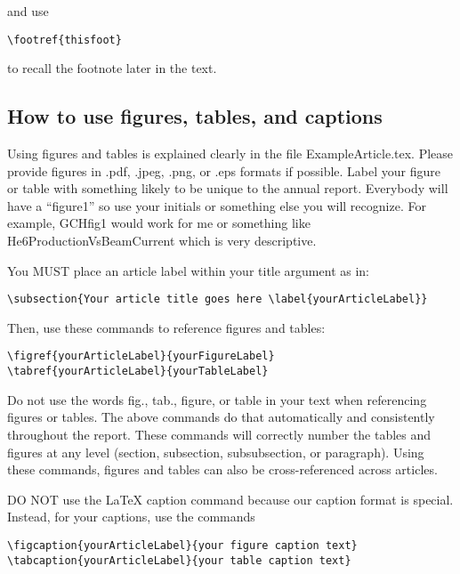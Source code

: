 \documentclass[twoside,11pt]{article}
\begin{document}
\noindent
and use 

\begin{verbatim}
\footref{thisfoot} 
\end{verbatim}

\noindent
to recall the footnote later in the text.

\subsection{How to use figures, tables, and captions}

Using figures and tables is explained clearly in the file ExampleArticle.tex. Please provide figures in .pdf, .jpeg, .png, or .eps formats if possible. Label your figure or table with something likely to be unique to the annual report.  Everybody will have a ``figure1'' so use your initials or something else you will recognize.  For example, GCHfig1 would work for me or something like He6ProductionVsBeamCurrent which is very descriptive.

\noindent
You MUST place an article label within your title argument as in: 

\begin{verbatim}
\subsection{Your article title goes here \label{yourArticleLabel}} 
\end{verbatim}

\noindent
Then, use these commands to reference figures and tables:

\begin{verbatim}
\figref{yourArticleLabel}{yourFigureLabel}
\tabref{yourArticleLabel}{yourTableLabel}
\end{verbatim}

\noindent
Do not use the words fig., tab., figure, or table in your text when referencing figures or tables. The above commands do that automatically and consistently throughout the report. These commands will correctly number the tables and figures at any level (section, subsection, subsubsection, or paragraph). Using these commands, figures and tables can also be cross-referenced across articles. 

\newpage
\noindent
DO NOT use the LaTeX caption command because our caption format is special. Instead, for your captions, use  the commands

\begin{verbatim}
\figcaption{yourArticleLabel}{your figure caption text} 
\tabcaption{yourArticleLabel}{your table caption text} 
\end{verbatim}
\end{document}
